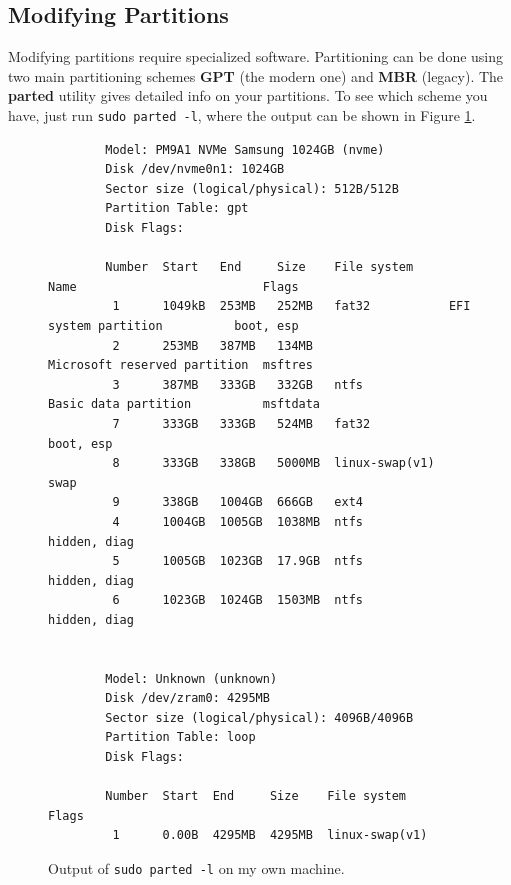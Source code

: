 \documentclass{article}
\begin{document}
  \subsection{Modifying Partitions} 
    
    Modifying partitions require specialized software. Partitioning can be done using two main partitioning schemes \textbf{GPT} (the modern one) and \textbf{MBR} (legacy). The \textbf{parted} utility gives detailed info on your partitions. To see which scheme you have, just run \texttt{sudo parted -l}, where the output can be shown in Figure \ref{fig:parted}. 

    \begin{figure}[hbt!]
      \centering 
      \begin{lstlisting} 
        Model: PM9A1 NVMe Samsung 1024GB (nvme)
        Disk /dev/nvme0n1: 1024GB
        Sector size (logical/physical): 512B/512B
        Partition Table: gpt
        Disk Flags: 

        Number  Start   End     Size    File system     Name                          Flags
         1      1049kB  253MB   252MB   fat32           EFI system partition          boot, esp
         2      253MB   387MB   134MB                   Microsoft reserved partition  msftres
         3      387MB   333GB   332GB   ntfs            Basic data partition          msftdata
         7      333GB   333GB   524MB   fat32                                         boot, esp
         8      333GB   338GB   5000MB  linux-swap(v1)                                swap
         9      338GB   1004GB  666GB   ext4
         4      1004GB  1005GB  1038MB  ntfs                                          hidden, diag
         5      1005GB  1023GB  17.9GB  ntfs                                          hidden, diag
         6      1023GB  1024GB  1503MB  ntfs                                          hidden, diag


        Model: Unknown (unknown)
        Disk /dev/zram0: 4295MB
        Sector size (logical/physical): 4096B/4096B
        Partition Table: loop
        Disk Flags: 

        Number  Start  End     Size    File system     Flags
         1      0.00B  4295MB  4295MB  linux-swap(v1) 
      \end{lstlisting}
      \caption{Output of \texttt{sudo parted -l} on my own machine. } 
      \label{fig:parted}
    \end{figure}
\end{document}
